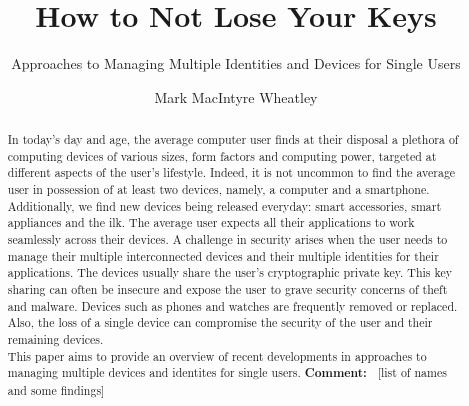 \documentclass[sigconf]{acmart}
\def\comment#1{{\color{blue}\textbf{Comment:~} #1}}
\begin{document}
\title{How to Not Lose Your Keys}
\subtitle{Approaches to Managing Multiple Identities and Devices for Single Users}


\author{Mark MacIntyre Wheatley}

\begin{abstract}

In today's day and age, the average computer user finds at their disposal a plethora of computing devices of various sizes, form factors and computing power, targeted at different aspects of the user's lifestyle. Indeed, it is not uncommon to find the average user in possession of at least two devices, namely, a computer and a smartphone. Additionally, we find new devices being released everyday: smart accessories, smart appliances and the ilk. The average user expects all their applications to work seamlessly across their devices. A challenge in security arises when the user needs to manage their multiple interconnected devices and their multiple identities for their applications. The devices usually share the user's cryptographic private key. This key sharing can often be insecure and expose the user to grave security concerns of theft and malware. Devices such as phones and watches are frequently removed or replaced. Also, the loss of a single device can compromise the security of the user and their remaining devices.\\
This paper aims to provide an overview of recent developments in approaches to managing multiple devices and identites for single users. \comment{[list of names and some findings]}

\end{abstract}


\maketitle




 
\end{document}
